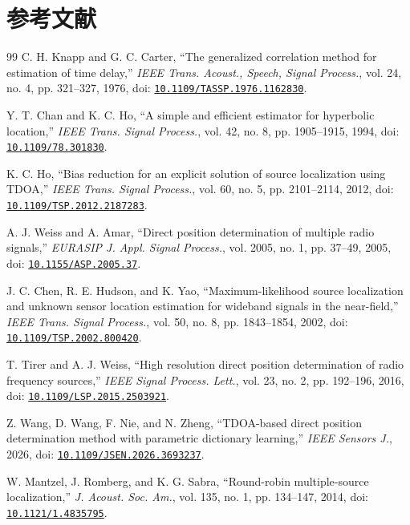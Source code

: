 \documentclass[11pt,a4paper]{article}
\numberwithin{equation}{section}
\numberwithin{figure}{section}
\numberwithin{table}{section}
\begin{document}
\section{参考文献}\label{sec:5}
\begin{thebibliography}{99}
\small
{}C. H. Knapp and G. C. Carter, ``The generalized correlation method for estimation of time delay,'' \emph{IEEE Trans. Acoust., Speech, Signal Process.}, vol. 24, no. 4, pp. 321--327, 1976, doi: \href{https://doi.org/10.1109/TASSP.1976.1162830}{\nolinkurl{10.1109/TASSP.1976.1162830}}.

Y. T. Chan and K. C. Ho, ``A simple and efficient estimator for hyperbolic location,'' \emph{IEEE Trans. Signal Process.}, vol. 42, no. 8, pp. 1905--1915, 1994, doi: \href{https://doi.org/10.1109/78.301830}{\nolinkurl{10.1109/78.301830}}.

K. C. Ho, ``Bias reduction for an explicit solution of source localization using TDOA,'' \emph{IEEE Trans. Signal Process.}, vol. 60, no. 5, pp. 2101--2114, 2012, doi: \href{https://doi.org/10.1109/TSP.2012.2187283}{\nolinkurl{10.1109/TSP.2012.2187283}}.

A. J. Weiss and A. Amar, ``Direct position determination of multiple radio signals,'' \emph{EURASIP J. Appl. Signal Process.}, vol. 2005, no. 1, pp. 37--49, 2005, doi: \href{https://doi.org/10.1155/ASP.2005.37}{\nolinkurl{10.1155/ASP.2005.37}}.

J. C. Chen, R. E. Hudson, and K. Yao, ``Maximum-likelihood source localization and unknown sensor location estimation for wideband signals in the near-field,'' \emph{IEEE Trans. Signal Process.}, vol. 50, no. 8, pp. 1843--1854, 2002, doi: \href{https://doi.org/10.1109/TSP.2002.800420}{\nolinkurl{10.1109/TSP.2002.800420}}.

T. Tirer and A. J. Weiss, ``High resolution direct position determination of radio frequency sources,'' \emph{IEEE Signal Process. Lett.}, vol. 23, no. 2, pp. 192--196, 2016, doi: \href{https://doi.org/10.1109/LSP.2015.2503921}{\nolinkurl{10.1109/LSP.2015.2503921}}.

 Z. Wang, D. Wang, F. Nie, and N. Zheng, ``TDOA-based direct position determination method with parametric dictionary learning,'' \emph{IEEE Sensors J.}, 2026, doi: \href{https://doi.org/10.1109/JSEN.2026.3693237}{\nolinkurl{10.1109/JSEN.2026.3693237}}.

W. Mantzel, J. Romberg, and K. G. Sabra, ``Round-robin multiple-source localization,'' \emph{J. Acoust. Soc. Am.}, vol. 135, no. 1, pp. 134--147, 2014, doi: \href{https://doi.org/10.1121/1.4835795}{\nolinkurl{10.1121/1.4835795}}.


\end{thebibliography}
\end{document}
